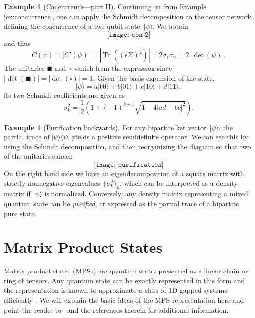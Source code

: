 \documentclass[aps,pra,12pt,nofootinbib,superscriptaddress,longbibliography]{revtex4-1}
\DeclareMathOperator{\trace}{Tr}  %
\theoremstyle{plain}
\theoremstyle{definition}
\newtheorem{example}[theorem]{Example}
\newcommand{\ket}[1]{\mbox{$|#1\rangle$}}
\newcommand{\ketbra}[2]{\mbox{$|#1\rangle\langle #2|$}}
\newcommand{\be}{\begin{equation}}
\newcommand{\ee}{\end{equation}}
\begin{document}
\begin{example}[Concurrence---part II] \label{ex:con-2}
Continuing on from Example \ref{ex:concurrence}, one can apply the Schmidt decomposition to the
tensor network defining the concurrence of a two-qubit state~$\ket{\psi}$. We obtain
\be
\texttt{[image: con-2]}
\ee
and thus
\be
C(\psi) = |C'(\psi)| =
\left|\trace((\epsilon \Sigma)^2)\right|
= 2 \sigma_1 \sigma_2
= 2 \, |\det(\psi)|.
\ee
The unitaries $\blacksquare$ and~$\square$ vanish from the expression since $|\det(\blacksquare)| = |\det(\square)| = 1$.
Given the basis expansion of the state,
\begin{equation}
\ket{\psi} = a\ket{00} +b\ket{01} +c\ket{10} +d\ket{11},
\end{equation}
its two Schmidt coefficients are given as
\begin{equation}
\sigma_k^2=\frac{1}{2}\left( 1 +(-1)^{k+1} \sqrt{1-4|ad-bc|^2}
\right).
\end{equation}
\end{example}


\begin{example}[Purification backwards] 
 
For any bipartite ket vector~$\ket{\psi}$,
the partial trace of $\ketbra{\psi}{\psi}$ yields a positive semidefinite operator.
We can see this by using the Schmidt decomposition, and then reorganizing the diagram
so that two of the unitaries cancel:
\be
\texttt{[image: purification]}
\ee
On the right hand side we have an eigendecomposition of a square matrix with
strictly nonnegative eigenvalues~$\{\sigma_k^2\}_k$,
which can be interpreted as a density matrix if $\ket{\psi}$ is normalized.
Conversely, any density matrix representing a mixed quantum state
can be \emph{purified}, or expressed as the partial trace of a bipartite pure state.
\end{example}




\section{Matrix Product States}\label{sec:dmps}

Matrix product states (MPSs) are
quantum states presented as a linear chain or ring of tensors.
Any quantum state can be exactly represented in this form and
the representation is known to approximate a class of 1D gapped systems efficiently \cite{2007JSMTE..08...24H}.   We will explain the basic ideas of the MPS representation here and point the reader to~\cite{MPSreview08,TNSreview09} and the references therein for additional information.
\end{document}
